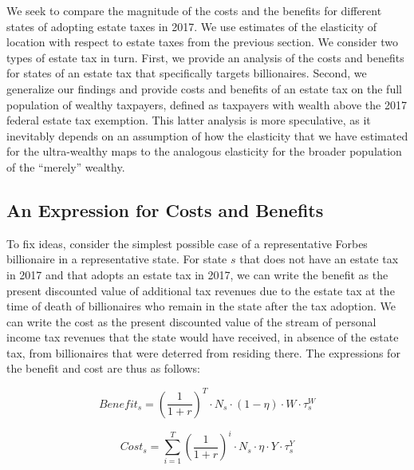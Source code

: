 \documentclass[12pt]{article}
\begin{document}
We seek to compare the magnitude of the costs and the benefits for different states of adopting estate taxes in 2017. We use estimates of the elasticity of location with respect to estate taxes from the previous section. We consider two types of estate tax in turn. First, we provide an analysis of the costs and benefits for states of an estate tax that specifically targets billionaires.
Second, we generalize our findings and provide costs and benefits of an estate tax on the full population of wealthy taxpayers, defined as taxpayers with wealth above the 2017 federal estate tax exemption. This latter analysis is more speculative, as it inevitably depends on an assumption of how the elasticity that we have estimated for the ultra-wealthy maps to the analogous elasticity for the broader population of the ``merely'' wealthy. 


\vspace{0.5cm}

\subsection{An Expression for Costs and Benefits}
To fix ideas, consider the simplest possible case of a representative Forbes billionaire in a representative state. For state $s$ that does not have an estate tax in 2017 and that adopts an estate tax in 2017, we can write the benefit as the present discounted value of additional tax revenues due to the estate tax at the time of death of billionaires who remain in the state after the tax adoption. We can write the cost as the present discounted value of the stream of personal income tax revenues that the state would have received, in absence of the estate tax, from billionaires that were deterred from residing there. The expressions for the benefit and cost are thus as follows:

\begin{equation}
\label{eq1}
     Benefit_s = (\frac{1}{1+r})^{T} \cdot N_{s} \cdot (1 - \eta) \cdot W \cdot \tau_s^{W}  
\end{equation} 

\begin{equation}
\label{eq2}
     Cost_s = \sum_{i=1}^{T}(\frac{1}{1+r})^{i} \cdot N_{s} \cdot \eta \cdot Y \cdot \tau_s^{Y}   
\end{equation}
\end{document}
